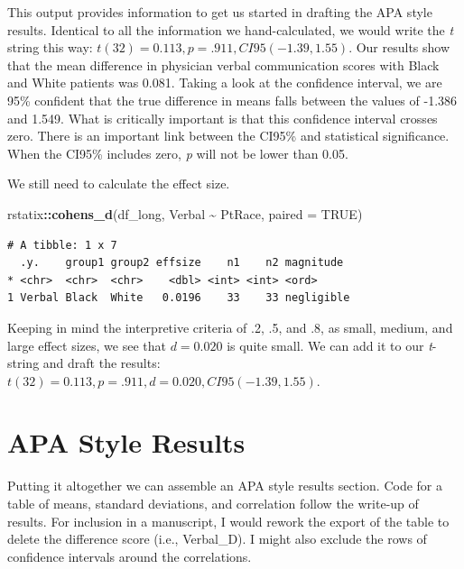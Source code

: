 \documentclass[
  11pt,
]{book}
\newenvironment{Shaded}{\begin{snugshade}}{\end{snugshade}}
\newcommand{\AttributeTok}[1]{\textcolor[rgb]{0.27,0.27,0.27}{#1}}
\newcommand{\ConstantTok}[1]{\textcolor[rgb]{0.37,0.37,0.37}{#1}}
\newcommand{\FunctionTok}[1]{\textcolor[rgb]{0.27,0.27,0.27}{\textbf{#1}}}
\newcommand{\NormalTok}[1]{#1}
\newcommand{\SpecialCharTok}[1]{\textcolor[rgb]{0.43,0.43,0.43}{\textbf{#1}}}
\begin{document}
This output provides information to get us started in drafting the APA style results. Identical to all the information we hand-calculated, we would write the \emph{t} string this way: \(t(32) = 0.113, p = .911, CI95(-1.39, 1.55)\). Our results show that the mean difference in physician verbal communication scores with Black and White patients was 0.081. Taking a look at the confidence interval, we are 95\% confident that the true difference in means falls between the values of -1.386 and 1.549. What is critically important is that this confidence interval crosses zero. There is an important link between the CI95\% and statistical significance. When the CI95\% includes zero, \emph{p} will not be lower than 0.05.

We still need to calculate the effect size.

\begin{Shaded}
\begin{Highlighting}[]
\NormalTok{rstatix}\SpecialCharTok{::}\FunctionTok{cohens\_d}\NormalTok{(df\_long, Verbal }\SpecialCharTok{\textasciitilde{}}\NormalTok{ PtRace, }\AttributeTok{paired =} \ConstantTok{TRUE}\NormalTok{)}
\end{Highlighting}
\end{Shaded}

\begin{verbatim}
# A tibble: 1 x 7
  .y.    group1 group2 effsize    n1    n2 magnitude 
* <chr>  <chr>  <chr>    <dbl> <int> <int> <ord>     
1 Verbal Black  White   0.0196    33    33 negligible
\end{verbatim}

Keeping in mind the interpretive criteria of .2, .5, and .8, as small, medium, and large effect sizes, we see that \(d = 0.020\) is quite small. We can add it to our \emph{t}-string and draft the results: \(t(32) = 0.113, p = .911, d = 0.020, CI95(-1.39, 1.55)\).

\hypertarget{apa-style-results-2}{%
\section{APA Style Results}\label{apa-style-results-2}}

Putting it altogether we can assemble an APA style results section. Code for a table of means, standard deviations, and correlation follow the write-up of results. For inclusion in a manuscript, I would rework the export of the table to delete the difference score (i.e., Verbal\_D). I might also exclude the rows of confidence intervals around the correlations.
\end{document}
